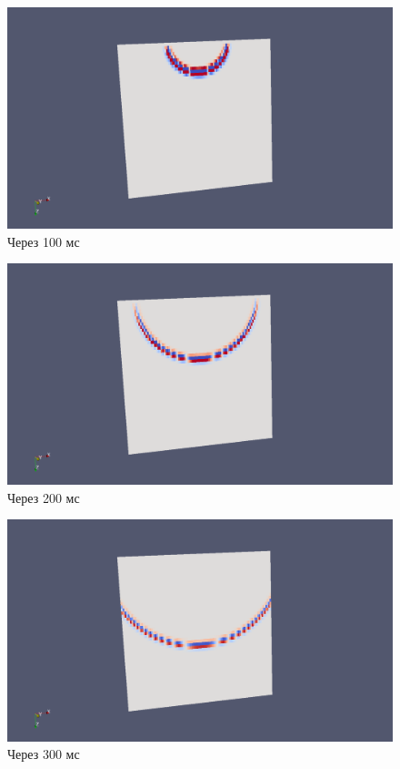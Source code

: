 \documentclass{article}
\begin{document}
\begin{figure}[ht]
  \center
  \includegraphics[scale=0.2]{pic_kirchhoff_scalar/point_1.png}
  \caption{Через 100 мс}
\label{img_point_1}
\end{figure}
\begin{figure}[ht]
  \center
  \includegraphics[scale=0.2]{pic_kirchhoff_scalar/point_2.png}
  \caption{Через 200 мс}
\label{img_point_2}
\end{figure}
\begin{figure}[ht]
  \center
  \includegraphics[scale=0.2]{pic_kirchhoff_scalar/point_3.png}
  \caption{Через 300 мс}
\label{img_point_3}
\end{figure}
\end{document}
